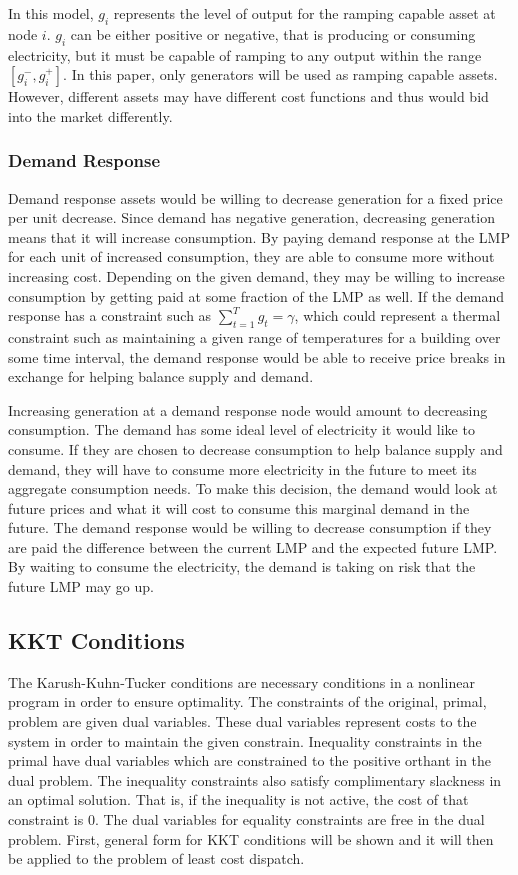	In this model, $g_i$ represents the level of output for the ramping capable asset at node $i$.  $g_i$ can be either positive or negative, that is producing or consuming electricity, but it must be capable of ramping to any output within the range $\left[g_i^-,g_i^+ \right]$.  In this paper, only generators will be used as ramping capable assets.  However, different assets may have different cost functions and thus would bid into the market differently.    

\subsubsection{Demand Response}
Demand response assets would be willing to decrease generation for a fixed price per unit decrease.  Since demand has negative generation, decreasing generation means that it will increase consumption.  By paying demand response at the LMP for each unit of increased consumption, they are able to consume more without increasing cost.  Depending on the given demand, they may be willing to increase consumption by getting paid at some fraction of the LMP as well.  If the demand response has a constraint such as $\sum_{t=1}^T g_t = \gamma$, which could represent a thermal constraint such as maintaining a given range of temperatures for a building over some time interval, the demand response would be able to receive price breaks in exchange for helping balance supply and demand.  

Increasing generation at a demand response node would amount to decreasing consumption.  The demand has some ideal level of electricity it would like to consume.  If they are chosen to decrease consumption to help balance supply and demand, they will have to consume more electricity in the future to meet its aggregate consumption needs.  To make this decision, the demand would look at future prices and what it will cost to consume this marginal demand in the future.  The demand response would be willing to decrease consumption if they are paid the difference between the current LMP and the expected future LMP.  By waiting to consume the electricity, the demand is taking on risk that the future LMP may go up.

\subsection{KKT Conditions}
	The Karush-Kuhn-Tucker conditions are necessary conditions in a nonlinear program in order to ensure optimality.  The constraints of the original, primal, problem are given dual variables.  These dual variables represent costs to the system in order to maintain the given constrain.  Inequality constraints in the primal have dual variables which are constrained to the positive orthant in the dual problem.  The inequality constraints also satisfy complimentary slackness in an optimal solution.  That is, if the inequality is not active, the cost of that constraint is 0.  The dual variables for equality constraints are free in the dual problem.  First, general form for KKT conditions will be shown and it will then be applied to the problem of least cost dispatch.

